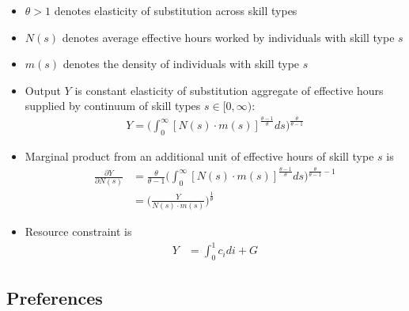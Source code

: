 \documentclass{article}
\begin{document}
\begin{itemize}
\item $\theta > 1$ denotes elasticity of substitution across skill types
\item $N(s)$ denotes average effective hours worked by individuals with skill type $s$
\item $m(s)$ denotes the density of individuals with skill type $s$
\item Output $Y$ is constant elasticity of substitution aggregate of effective hours supplied by continuum of skill types $s \in [0,\infty)$:
\begin{align}
Y = \Bigg( \int_0^\infty [N(s) \cdot m(s)]^{\frac{\theta - 1}{\theta}} ds \Bigg)^{\frac{\theta}{\theta - 1}} \label{fg_production}
\end{align}
\item Marginal product from an additional unit of effective hours of skill type $s$ is
\begin{align*}
\frac{\partial Y}{\partial N(s)} &= \frac{\theta}{\theta - 1}\Bigg( \int_0^\infty [N(s) \cdot m(s)]^{\frac{\theta - 1}{\theta}} ds \Bigg)^{\frac{\theta}{\theta - 1} - 1}\\
&= \Bigg( \frac{Y}{N(s)\cdot m(s)} \Bigg)^{\frac{1}{\theta}}
\end{align*}
\item Resource constraint is
\begin{align}
Y &= \int_0^1 c_i di + G \label{rc}
\end{align}
\end{itemize}



\subsection{Preferences}
\end{document}
